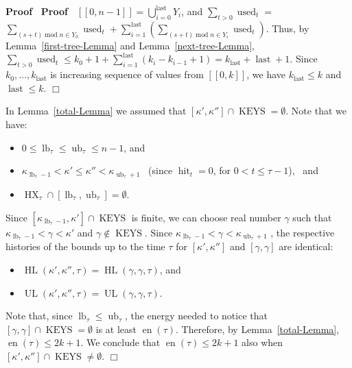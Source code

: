 \documentclass{article}
\newcommand{\tmop}[1]{\ensuremath{\operatorname{#1}}}
\newenvironment{proof}{\noindent\textbf{Proof\ }}{\hspace*{\fill}$\Box$\medskip}
\begin{document}
\begin{proof}
  \begin{proof}
   $[[0, n - 1]] = \bigcup_{i = 0}^{\tmop{last}}
    Y_i$, and 
$\sum_{t > 0} \tmop{used}_t = $
$\sum_{(s + t) \tmop{mod} n \in
    Y_0} \tmop{used}_t + \sum_{i = 1}^{\tmop{last}} ( \sum_{(s + t) \tmop{mod}
    n \in Y_i} \tmop{used}_t) \text{}$. Thus, by Lemma~\ref{first-tree-Lemma}
    and Lemma~\ref{next-tree-Lemma}, $\sum_{t > 0} \tmop{used}_t \leq k_0 + 1
    + \sum_{i = 1}^{\tmop{last}} (k_i - k_{i - 1} + 1) = k_{\tmop{last}} +
    \tmop{last} + 1$. Since $k_0, \ldots, k_{\tmop{last}}$ is increasing
    sequence of values from $[[0, k]]$, we have $k_{\tmop{last}} \leq k$ and
    $\tmop{last} \leq k$.
  \end{proof}
  
  In Lemma~\ref{total-Lemma} we assumed that $[\kappa', \kappa''] \cap
  \tmop{KEYS} = \emptyset$. Note that we have:
  \begin{itemize}
    \item $0 \leq \tmop{lb}_{\tau} \leq \tmop{ub}_{\tau} \leq n - 1$,
    and
    
    \item $\kappa_{\tmop{lb}_{\tau } - 1} < \kappa' \leq \kappa'' <
    \kappa_{\tmop{ub}_{\tau } + 1}$ \ (since $\tmop{hit}_t = 0$, for $0 < t
    \leq \tau - 1$), \ and
    
    \item $\tmop{HX}_{\tau} \cap [\tmop{lb}_{\tau}, \tmop{ub}_{\tau}] = \emptyset$.
  \end{itemize}
  Since $[\kappa_{\tmop{lb}_{\tau} - 1}, \kappa'] \cap \tmop{KEYS}$ is
  finite, we can choose real number $\gamma$ such that
  $\kappa_{\tmop{lb}_{\tau} - 1} < \gamma < \kappa'$ and $\gamma \not\in
  \tmop{KEYS}$. Since $\kappa_{\tmop{lb}_{\tau} - 1} < \gamma <
  \kappa_{\tmop{ub}_{\tau} + 1}$ , the respective histories of the bounds
  up to the time $\tau$ for $[\kappa', \kappa'']$ and $[\gamma, \gamma]$
  are identical:
  \begin{itemize}
    \item $\tmop{HL} (\kappa', \kappa'', \tau) = \tmop{HL} (\gamma,
    \gamma, \tau)$, and
    
    \item $\tmop{UL} (\kappa', \kappa'', \tau) = \tmop{UL} (\gamma,
    \gamma, \tau)$.
  \end{itemize}
  Note that, since $\tmop{lb}_{\tau} \leq \tmop{ub}_{\tau}$, the
  energy needed to notice that $[\gamma, \gamma]\cap \tmop{KEYS} = \emptyset$
  is at least $\tmop{en} (\tau)$.
  Therefore, by Lemma~\ref{total-Lemma}, $\tmop{en} (\tau) \leq 2 k + 1$. We
  conclude that $\tmop{en} (\tau) \leq 2 k + 1$ also when $[\kappa', \kappa'']
  \cap \tmop{KEYS} \not=  \emptyset$.
\end{proof}
\end{document}
